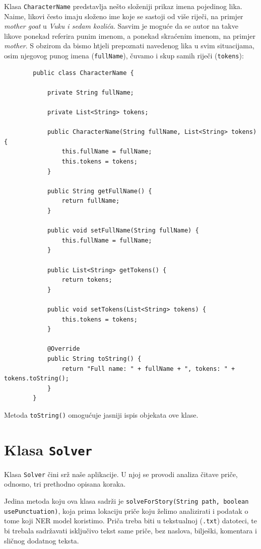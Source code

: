 \documentclass[a4paper,twoside,12pt]{memoir} %
\newcommand{\ti}[1]{\textit{#1\/}}
\begin{document}
		\vspace*{6pt}
		Klasa \texttt{CharacterName} predstavlja nešto složeniji prikaz imena pojedinog lika. Naime, likovi često imaju složeno ime koje se sastoji od više riječi, na primjer \textit{mother goat} u \ti{Vuku i sedam kozlića}. Sasvim je moguće da se autor na takve likove ponekad referira punim imenom, a ponekad skraćenim imenom, na primjer \textit{mother}. S obzirom da bismo htjeli prepoznati navedenog lika u svim situacijama, osim njegovog punog imena (\texttt{fullName}), čuvamo i skup samih riječi (\texttt{tokens}):

		\begin{lstlisting}
		public class CharacterName {

			private String fullName;

			private List<String> tokens;

			public CharacterName(String fullName, List<String> tokens) {
				this.fullName = fullName;
				this.tokens = tokens;
			}

			public String getFullName() {
				return fullName;
			}

			public void setFullName(String fullName) {
				this.fullName = fullName;
			}

			public List<String> getTokens() {
				return tokens;
			}

			public void setTokens(List<String> tokens) {
				this.tokens = tokens;
			}

			@Override
			public String toString() {
				return "Full name: " + fullName + ", tokens: " + tokens.toString();
			}
		}
		\end{lstlisting}

		Metoda \texttt{toString()} omogućuje jasniji ispis objekata ove klase.

	\section{Klasa \texttt{Solver}}

		Klasa \texttt{Solver} čini srž naše aplikacije. U njoj se provodi analiza čitave priče, odnosno, tri prethodno opisana koraka.

		\vspace*{6pt}
		Jedina metoda koju ova klasa sadrži je \texttt{solveForStory(String path, \!boolean usePunctuation)}, koja prima lokaciju priče koju želimo analizirati i podatak o tome koji NER model koristimo. Priča treba biti u tekstualnoj (\texttt{.txt}) datoteci, te bi trebala sadržavati isključivo tekst same priče, bez naslova, bilješki, komentara i sličnog dodatnog teksta.
\end{document}
